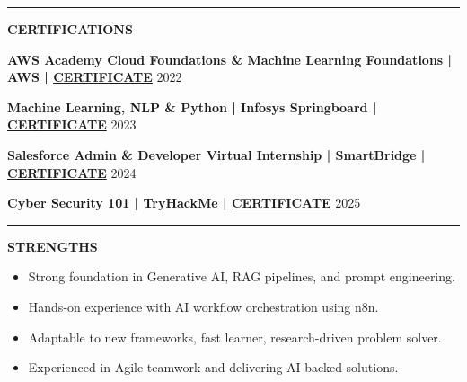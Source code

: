 \documentclass[11pt,a4paper]{article}
\newcommand{\certificate}[1]{\href{#1}{CERTIFICATE}}
\newcommand{\resumesection}[1]{
	\vspace{0.2cm}
	\hrule
	\vspace{0.2cm}
	\centerline{\large\textbf{#1}}
	\vspace{0.15cm}
}
\begin{document}
	
	\resumesection{CERTIFICATIONS}
	

	
	\noindent \textbf{AWS Academy Cloud Foundations \& Machine Learning Foundations | AWS | \certificate{https://github.com/ValupadasuSaiabbhiram/Certificates/blob/main/AWS_Academy_Graduate___AWS_Academy_Cloud_Foundations_Badge20230729-28-vxr2h0.pdf}} \hfill 2022
	
	\noindent \textbf{Machine Learning, NLP \& Python | Infosys Springboard | \certificate{https://github.com/ValupadasuSaiabbhiram/Certificates/blob/main/Machine\%20Learning\%2C\%20NLP\%20\%26\%20Python.pdf}} \hfill 2023
	
	\noindent \textbf{Salesforce Admin \& Developer Virtual Internship | SmartBridge | \certificate{https://www.salesforce.com/trailblazer/svalupadasu}} \hfill 2024
	
	\noindent \textbf{Cyber Security 101 | TryHackMe | \certificate{https://github.com/ValupadasuSaiabbhiram/Certificates/blob/main/Advent\%20of\%20Cyber\%202024.pdf}
	} \hfill 2025
	
	
	\resumesection{STRENGTHS}
	\begin{itemize}
		\item Strong foundation in Generative AI, RAG pipelines, and prompt engineering.
		\item Hands-on experience with AI workflow orchestration using n8n.
		\item Adaptable to new frameworks, fast learner, research-driven problem solver.
		\item Experienced in Agile teamwork and delivering AI-backed solutions.
	\end{itemize}
	
\end{document}
